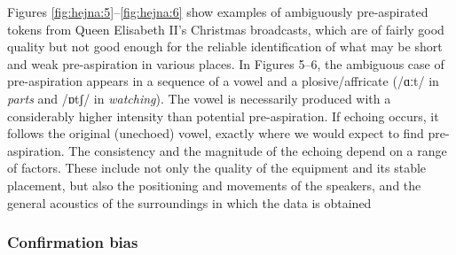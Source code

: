 \documentclass[output=paper]{langscibook}
\begin{document}
Figures \ref{fig:hejna:5}--\ref{fig:hejna:6} show examples of ambiguously pre-aspirated tokens from Queen Elisabeth II’s Christmas broadcasts, which are of fairly good quality but not good enough for the reliable identification of what may be short and weak pre\hyp aspiration in various places. In Figures 5--6, the ambiguous case of pre\hyp aspiration appears in a sequence of a vowel and a plosive/affricate (/ɑːt/ in \textit{parts} and /ɒtʃ/ in \textit{watching}). The vowel is necessarily produced with a considerably higher intensity than potential pre-aspiration. If echoing occurs, it follows the original (unechoed) vowel, exactly where we would expect to find pre-aspiration. The consistency and the magnitude of the echoing depend on a range of factors. These include not only the quality of the equipment and its stable placement, but also the positioning and movements of the speakers, and the general acoustics of the surroundings in which the data is obtained

\subsubsection{Confirmation bias}
\end{document}
